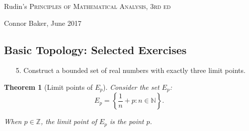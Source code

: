 \documentclass[10pt]{article}
\theoremstyle{definition}
\theoremstyle{plain}
\newtheorem*{theorem*}{Theorem}
\newcommand{\N}{\mathbb{N}}
\newcommand{\Z}{\mathbb{Z}}
\begin{document}

\begin{center}
  {\Large Rudin's \textsc{Principles of Mathematical Analysis, 3rd ed}}

  {\large Connor Baker, June 2017}

  \subsection*{Basic Topology: Selected Exercises}
\end{center}
\begin{enumerate}
\item[5.] Construct a bounded set of real numbers with exactly three limit points.
\end{enumerate}

\begin{theorem*}[Limit points of $E_p$]\label{theorem:thm1}
Consider the set $E_p$:
$$E_p = \left\{\frac{1}{n}+p: n\in\N\right\}.$$

When $p\in\Z$, the limit point of $E_p$ is the point $p$.
\end{theorem*}
\end{document}
